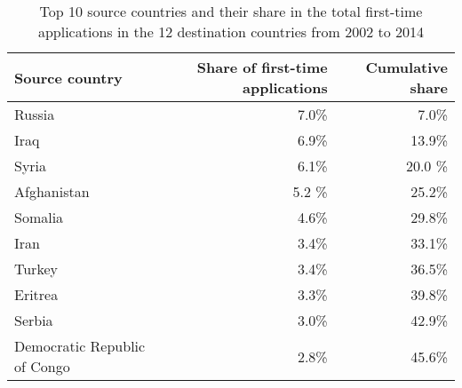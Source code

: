 
\begin{table}[htbp]\centering
\caption{Top 10 source countries and their share in the total first-time applications in the 12 destination countries from 2002 to 2014}
\begin{tabular}{l r r}
\hline \hline
\textbf{Source country} & \textbf{ Share of first-time applications}  & \textbf{Cumulative share} \\
\hline \hline
\smallskip
Russia &  7.0\% & 7.0\% \\
\smallskip
Iraq & 6.9\%  & 13.9\% \\
\smallskip
Syria & 6.1\%  & 20.0 \%  \\
\smallskip
Afghanistan & 5.2 \% & 25.2\% \\
\smallskip
Somalia & 4.6\% & 29.8\%  \\
\smallskip
Iran & 3.4\% & 33.1\%  \\
\smallskip
Turkey  & 3.4\% & 36.5\% \\
\smallskip 
Eritrea & 3.3\% & 39.8\% \\
\smallskip
Serbia & 3.0\% & 42.9\% \\
\smallskip
Democratic Republic of Congo  & 2.8\% & 45.6\% \\
\hline \hline
\end{tabular}
\label{origin_countries}
\end{table}